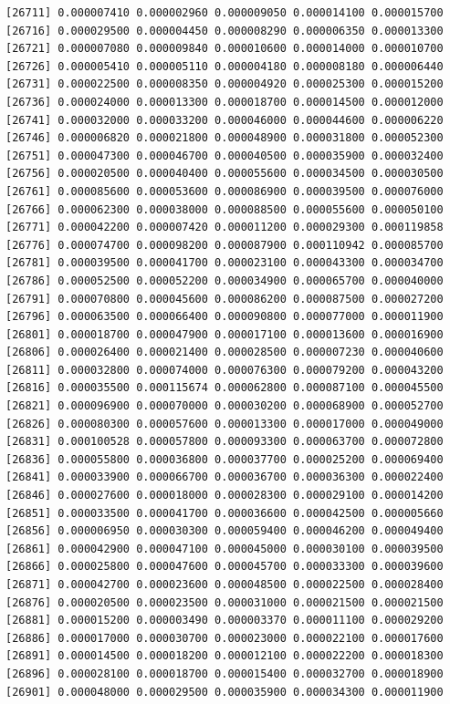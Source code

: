 \documentclass[]{article}
\begin{document}
\begin{verbatim}
[26711] 0.000007410 0.000002960 0.000009050 0.000014100 0.000015700
[26716] 0.000029500 0.000004450 0.000008290 0.000006350 0.000013300
[26721] 0.000007080 0.000009840 0.000010600 0.000014000 0.000010700
[26726] 0.000005410 0.000005110 0.000004180 0.000008180 0.000006440
[26731] 0.000022500 0.000008350 0.000004920 0.000025300 0.000015200
[26736] 0.000024000 0.000013300 0.000018700 0.000014500 0.000012000
[26741] 0.000032000 0.000033200 0.000046000 0.000044600 0.000006220
[26746] 0.000006820 0.000021800 0.000048900 0.000031800 0.000052300
[26751] 0.000047300 0.000046700 0.000040500 0.000035900 0.000032400
[26756] 0.000020500 0.000040400 0.000055600 0.000034500 0.000030500
[26761] 0.000085600 0.000053600 0.000086900 0.000039500 0.000076000
[26766] 0.000062300 0.000038000 0.000088500 0.000055600 0.000050100
[26771] 0.000042200 0.000007420 0.000011200 0.000029300 0.000119858
[26776] 0.000074700 0.000098200 0.000087900 0.000110942 0.000085700
[26781] 0.000039500 0.000041700 0.000023100 0.000043300 0.000034700
[26786] 0.000052500 0.000052200 0.000034900 0.000065700 0.000040000
[26791] 0.000070800 0.000045600 0.000086200 0.000087500 0.000027200
[26796] 0.000063500 0.000066400 0.000090800 0.000077000 0.000011900
[26801] 0.000018700 0.000047900 0.000017100 0.000013600 0.000016900
[26806] 0.000026400 0.000021400 0.000028500 0.000007230 0.000040600
[26811] 0.000032800 0.000074000 0.000076300 0.000079200 0.000043200
[26816] 0.000035500 0.000115674 0.000062800 0.000087100 0.000045500
[26821] 0.000096900 0.000070000 0.000030200 0.000068900 0.000052700
[26826] 0.000080300 0.000057600 0.000013300 0.000017000 0.000049000
[26831] 0.000100528 0.000057800 0.000093300 0.000063700 0.000072800
[26836] 0.000055800 0.000036800 0.000037700 0.000025200 0.000069400
[26841] 0.000033900 0.000066700 0.000036700 0.000036300 0.000022400
[26846] 0.000027600 0.000018000 0.000028300 0.000029100 0.000014200
[26851] 0.000033500 0.000041700 0.000036600 0.000042500 0.000005660
[26856] 0.000006950 0.000030300 0.000059400 0.000046200 0.000049400
[26861] 0.000042900 0.000047100 0.000045000 0.000030100 0.000039500
[26866] 0.000025800 0.000047600 0.000045700 0.000033300 0.000039600
[26871] 0.000042700 0.000023600 0.000048500 0.000022500 0.000028400
[26876] 0.000020500 0.000023500 0.000031000 0.000021500 0.000021500
[26881] 0.000015200 0.000003490 0.000003370 0.000011100 0.000029200
[26886] 0.000017000 0.000030700 0.000023000 0.000022100 0.000017600
[26891] 0.000014500 0.000018200 0.000012100 0.000022200 0.000018300
[26896] 0.000028100 0.000018700 0.000015400 0.000032700 0.000018900
[26901] 0.000048000 0.000029500 0.000035900 0.000034300 0.000011900

\end{verbatim}
\end{document}
